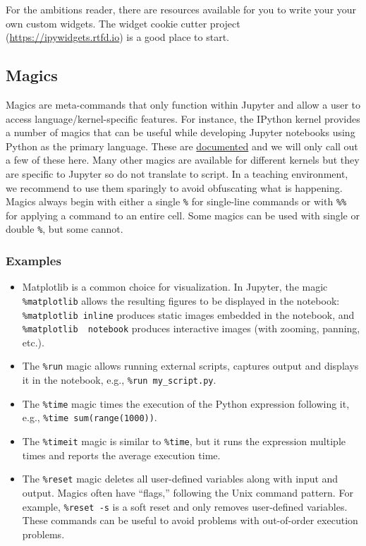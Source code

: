 \documentclass[]{book}
\begin{document}
For the ambitions reader, there are resources available for you to write
your your own custom widgets. The widget cookie cutter project
(\url{https://ipywidgets.rtfd.io}) is a good place to start.

\subsection{Magics}\label{magics}

Magics are meta-commands that only function within Jupyter and allow a
user to access language/kernel-specific features. For instance, the
IPython kernel provides a number of magics that can be useful while
developing Jupyter notebooks using Python as the primary language. These
are
\href{https://ipython.readthedocs.io/en/stable/interactive/magics.html}{documented}
and we will only call out a few of these here. Many other magics are
available for different kernels but they are specific to Jupyter so do
not translate to script. In a teaching environment, we recommend to use
them sparingly to avoid obfuscating what is happening. Magics always
begin with either a single \texttt{\%} for single-line commands or with
\texttt{\%\%} for applying a command to an entire cell. Some magics can
be used with single or double \texttt{\%}, but some cannot.

\subsubsection*{Examples}\label{examples}

\begin{itemize}
\item
  Matplotlib is a common choice for visualization. In Jupyter, the magic
  \texttt{\%matplotlib} allows the resulting figures to be displayed in
  the notebook: \texttt{\%matplotlib\ inline} produces static images
  embedded in the notebook, and \texttt{\%matplotlib\ \ notebook}
  produces interactive images (with zooming, panning, etc.).
\item
  The \texttt{\%run} magic allows running external scripts, captures
  output and displays it in the notebook, e.g.,
  \texttt{\%run\ my\_script.py}.
\item
  The \texttt{\%time} magic times the execution of the Python expression
  following it, e.g., \texttt{\%time\ sum(range(1000))}.
\item
  The \texttt{\%timeit} magic is similar to \texttt{\%time}, but it runs
  the expression multiple times and reports the average execution time.
\item
  The \texttt{\%reset} magic deletes all user-defined variables along
  with input and output. Magics often have ``flags,'' following the Unix
  command pattern. For example, \texttt{\%reset\ -s} is a soft reset and
  only removes user-defined variables. These commands can be useful to
  avoid problems with out-of-order execution problems.
\end{itemize}
\end{document}
